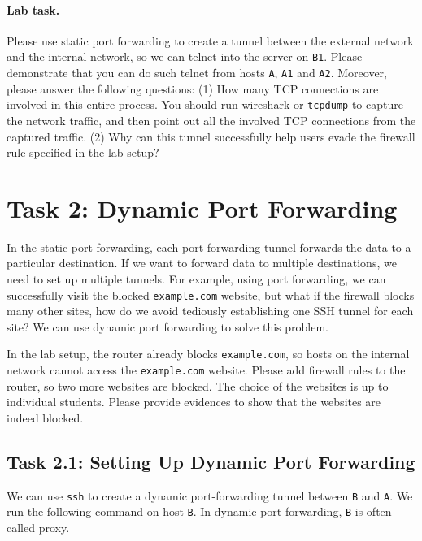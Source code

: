 \paragraph{Lab task.}
Please use static port forwarding to create a tunnel between the external network
and the internal network, so we can telnet into the server 
on \texttt{B1}. Please demonstrate that you can 
do such telnet from hosts \texttt{A}, \texttt{A1} and \texttt{A2}.  
Moreover, please answer the following questions:
(1) How many TCP connections are involved in this entire process. 
You should run wireshark or \texttt{tcpdump} to capture the network traffic,
and then point out all the involved TCP connections from the 
captured traffic. 
(2) Why can this tunnel successfully help users evade the firewall rule specified 
in the lab setup? 


\section{Task 2: Dynamic Port Forwarding} 

In the static port forwarding, each port-forwarding tunnel forwards
the data to a particular destination. If we want to forward
data to multiple destinations, we need to set up multiple
tunnels. For example, using port forwarding, we can successfully
visit the blocked \texttt{example.com} website, but what if the
firewall blocks many other sites, how do we avoid tediously
establishing one SSH tunnel for each site? 
We can use dynamic port forwarding to solve this problem. 


In the lab setup, the router already blocks
\texttt{example.com}, so hosts on the internal network 
cannot access the \texttt{example.com} website. Please add 
firewall rules to the router, so two more websites
are blocked. The choice of the websites is up to individual
students. Please provide evidences to show that 
the websites are indeed blocked. 


\subsection{Task 2.1: Setting Up Dynamic Port Forwarding}


We can use \texttt{ssh} to create a dynamic port-forwarding tunnel 
between \texttt{B} and \texttt{A}. We run the 
following command on host \texttt{B}. In dynamic port forwarding,
\texttt{B} is often called proxy.  


